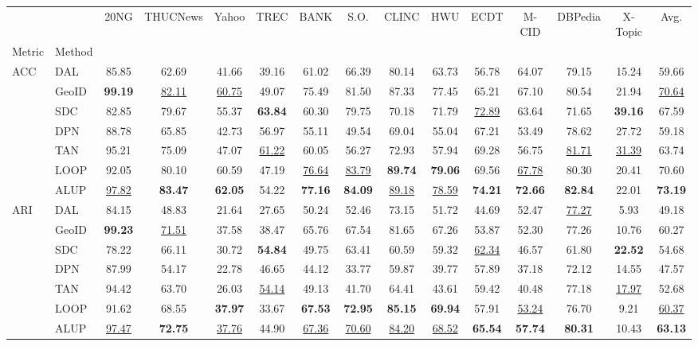 \begin{tabular}{llccccccccccccc}
\toprule
&&20NG&THUCNews&Yahoo&TREC&BANK&S.O.&CLINC&HWU&ECDT&M-CID&DBPedia&X-Topic&Avg.\\
Metric&Method&&&&&&&&&&&&&\\
\midrule
\multirow[t]{7}{*}{ACC}&DAL&85.85&62.69&41.66&39.16&61.02&66.39&80.14&63.73&56.78&64.07&79.15&15.24&59.66\\
&GeoID&\textbf{99.19}&\underline{82.11}&\underline{60.75}&49.07&75.49&81.50&87.33&77.45&65.21&67.10&80.54&21.94&\underline{70.64}\\
&SDC&82.85&79.67&55.37&\textbf{63.84}&60.30&79.75&70.18&71.79&\underline{72.89}&63.64&71.65&\textbf{39.16}&67.59\\
&DPN&88.78&65.85&42.73&56.97&55.11&49.54&69.04&55.04&67.21&53.49&78.62&27.72&59.18\\
&TAN&95.21&75.09&47.07&\underline{61.22}&60.05&56.27&72.93&57.94&69.28&56.75&\underline{81.71}&\underline{31.39}&63.74\\
&LOOP&92.05&80.10&60.59&47.19&\underline{76.64}&\underline{83.79}&\textbf{89.74}&\textbf{79.06}&69.56&\underline{67.78}&80.30&20.41&70.60\\
&ALUP&\underline{97.82}&\textbf{83.47}&\textbf{62.05}&54.22&\textbf{77.16}&\textbf{84.09}&\underline{89.18}&\underline{78.59}&\textbf{74.21}&\textbf{72.66}&\textbf{82.84}&22.01&\textbf{73.19}\\
\cline{1-15}
\multirow[t]{7}{*}{ARI}&DAL&84.15&48.83&21.64&27.65&50.24&52.46&73.15&51.72&44.69&52.47&\underline{77.27}&5.93&49.18\\
&GeoID&\textbf{99.23}&\underline{71.51}&37.58&38.47&65.76&67.54&81.65&67.26&53.87&52.30&77.26&10.76&60.27\\
&SDC&78.22&66.11&30.72&\textbf{54.84}&49.75&63.41&60.59&59.32&\underline{62.34}&46.57&61.80&\textbf{22.52}&54.68\\
&DPN&87.99&54.17&22.78&46.65&44.12&33.77&59.87&39.77&57.89&37.18&72.12&14.55&47.57\\
&TAN&94.42&63.70&26.03&\underline{54.14}&49.13&41.70&64.41&43.61&59.42&40.48&77.18&\underline{17.97}&52.68\\
&LOOP&91.62&68.55&\textbf{37.97}&33.67&\textbf{67.53}&\textbf{72.95}&\textbf{85.15}&\textbf{69.94}&57.91&\underline{53.24}&76.70&9.21&\underline{60.37}\\
&ALUP&\underline{97.47}&\textbf{72.75}&\underline{37.76}&44.90&\underline{67.36}&\underline{70.60}&\underline{84.20}&\underline{68.52}&\textbf{65.54}&\textbf{57.74}&\textbf{80.31}&10.43&\textbf{63.13}\\

\end{tabular}
